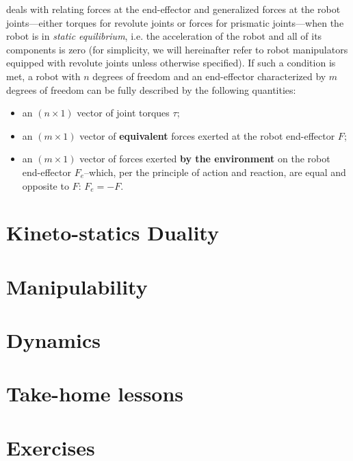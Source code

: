   deals with relating forces at the end-effector and generalized forces at the robot joints---either torques for revolute joints or forces for prismatic joints---when the robot is in \emph{static equilibrium}, i.e. the acceleration of the robot and all of its components is zero
(for simplicity, we will hereinafter refer to robot manipulators equipped with revolute joints unless otherwise specified).
If such a condition is met, a robot with $n$ degrees of freedom and an end-effector characterized by $m$ degrees of freedom can be fully described by the following quantities:
\begin{itemize}
    \item an $\left( n \times 1 \right)$ vector of joint torques $\tau$;
    \item an $\left( m \times 1 \right)$ vector of \textbf{equivalent} forces exerted at the robot end-effector $F$;
    \item an $\left( m \times 1 \right)$ vector of forces exerted \textbf{by the environment} on the robot end-effector $F_e$--which, per the principle of action and reaction, are equal and opposite to $F$: $F_e=-F$.
\end{itemize}

\vskip 40pt

\section{Kineto-statics Duality}

\section{Manipulability}

\section{Dynamics}\label{ch:forces:dynamics}


\section*{Take-home lessons}

\section*{Exercises}\small

